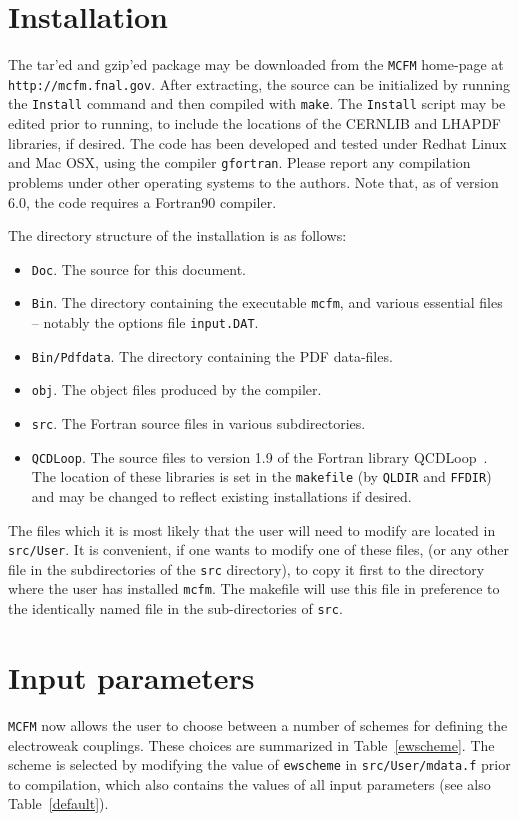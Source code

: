 \documentclass[12pt]{article}
\begin{document}
\section{Installation}

The tar'ed and gzip'ed package may be downloaded from
the {\tt MCFM} home-page at {\tt http://mcfm.fnal.gov}.
After extracting, the source can be initialized by running the
{\tt Install} command and then compiled with {\tt make}. The
{\tt Install} script may be edited prior to running, to include
the locations of the CERNLIB and LHAPDF libraries, if desired.
The code has been developed and tested under Redhat Linux and Mac OSX,
using the compiler {\tt gfortran}. Please report
any compilation problems under other operating systems to the authors.
Note that, as of version 6.0, the code requires a Fortran90 compiler.

The directory structure of the installation is as follows:
\begin{itemize}
\item {\tt Doc}. The source for this document.
\item {\tt Bin}. The directory containing the executable {\tt mcfm},
and various essential files -- notably the options file {\tt input.DAT}.
\item {\tt Bin/Pdfdata}. The directory containing the PDF data-files.
\item {\tt obj}. The object files produced by the compiler. 
\item {\tt src}. The Fortran source files in various subdirectories.
\item {\tt QCDLoop}. The source files to version 1.9 of the Fortran
library QCDLoop~\cite{Ellis:2007qk}. The location of these libraries
is set in the {\tt makefile} (by {\tt QLDIR} and {\tt FFDIR}) and may be
changed to reflect existing installations if desired. 
\end{itemize}
The files which it is most likely that the user will need to modify
are located in {\tt src/User}. It is convenient, if one wants to 
modify one of these files, (or any other file in the subdirectories of the 
{\tt src} directory),
to copy it first to the directory where the user has installed {\tt mcfm}.
The makefile will use this file in preference to the identically named
file in the sub-directories of {\tt src}.
 
\section{Input parameters}
\label{Input_parameters}
{\tt MCFM} now allows the user to choose between a number of schemes
for defining the electroweak couplings. These choices are summarized
in Table~\ref{ewscheme}. The scheme is selected by modifying the
value of {\tt ewscheme} in {\tt src/User/mdata.f} prior to compilation, 
which also contains
the values of all input parameters (see also Table~\ref{default}).
\end{document}
